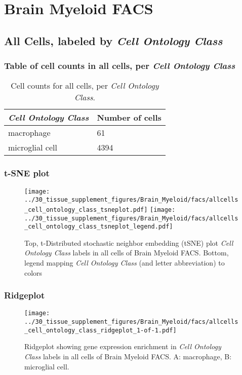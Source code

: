 \clearpage
\section{Brain Myeloid FACS}

\subsection{All Cells, labeled by \emph{Cell Ontology Class}}
\subsubsection{Table of cell counts in all cells, per \emph{Cell Ontology Class}}\begin{table}[h]
\centering
\label{my-label}
\begin{tabular}{@{}ll@{}}
\toprule

\emph{Cell Ontology Class}& Number of cells \\ \midrule
macrophage & 61 \\

microglial cell & 4394 \\
\bottomrule
\end{tabular}
\caption{Cell counts for all cells, per \emph{Cell Ontology Class}.}
\end{table}

\clearpage
\subsubsection{t-SNE plot}
\begin{figure}[h]
\centering
\texttt{[image: ../30\_tissue\_supplement\_figures/Brain\_Myeloid/facs/allcells\_cell\_ontology\_class\_tsneplot.pdf]}
\texttt{[image: ../30\_tissue\_supplement\_figures/Brain\_Myeloid/facs/allcells\_cell\_ontology\_class\_tsneplot\_legend.pdf]}
\caption{Top, t-Distributed stochastic neighbor embedding (tSNE) plot  \emph{Cell Ontology Class} labels in all cells of Brain Myeloid FACS. Bottom, legend mapping \emph{Cell Ontology Class} (and letter abbreviation) to colors}
\end{figure}


\clearpage

\subsubsection{Ridgeplot}
\begin{figure}[h]
\centering
\texttt{[image: ../30\_tissue\_supplement\_figures/Brain\_Myeloid/facs/allcells\_cell\_ontology\_class\_ridgeplot\_1-of-1.pdf]}

\caption{ Ridgeplot  showing gene expression enrichment in \emph{Cell Ontology Class} labels in all cells of Brain Myeloid FACS. A: macrophage, B: microglial cell.}
\end{figure}


